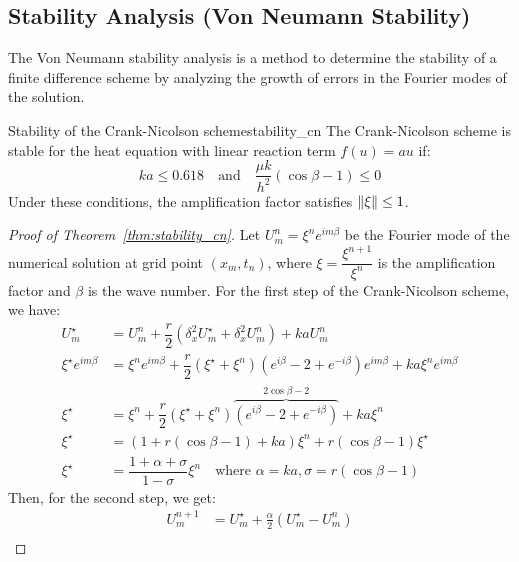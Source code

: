 \subsection{Stability Analysis (Von Neumann Stability)}
The Von Neumann stability analysis is a method to determine the stability of a finite difference scheme by analyzing the growth of errors in the Fourier modes of the solution.
\begin{theorem}{Stability of the Crank-Nicolson scheme}{stability_cn}
  The Crank-Nicolson scheme is stable for the heat equation with linear reaction term \(f(u) = au\) if:
  \[
    ka \leq 0.618 \quad \text{and} \quad \frac{\mu k}{h^2}(\cos\beta - 1) \leq 0
  \]
  Under these conditions, the amplification factor satisfies \(\lVert\xi\rVert \leq 1\).
\end{theorem}
\begin{proof}[Proof of Theorem~\ref{thm:stability_cn}]
  Let \(U_m^n = \xi^n e^{i m \beta}\) be the Fourier mode of the numerical solution at grid point \((x_m, t_n)\), where \(\xi=\dfrac{\xi^{n+1}}{\xi^n}\) is the amplification factor and \(\beta\) is the wave number.
  For the first step of the Crank-Nicolson scheme, we have:
  \begin{align*}
    U_m^\star               & = U_m^n + \dfrac{r}{2} (\delta_x^2 U_m^\star + \delta_x^2 U_m^n) + k a U_m^n                                                                     \\
    \xi^\star e^{i m \beta} & = \xi^n e^{i m \beta} + \dfrac{r}{2} \left(\xi^\star + \xi^n\right)\left(e^{i\beta} - 2 + e^{-i\beta}\right)e^{im\beta}+ k a \xi^n e^{i m \beta} \\
    \xi^\star               & = \xi^n + \dfrac{r}{2} \left(\xi^\star + \xi^n \right)\overbrace{\left(e^{i \beta} - 2 + e^{-i \beta}\right)}^{2\cos\beta - 2} + k a \xi^n       \\
    \xi^\star               & = (1 + r(\cos\beta - 1) + ka) \xi^n + r(\cos\beta - 1)\xi^\star                                                                                  \\
    \xi^\star               & = \dfrac{1 + \alpha + \sigma}{1 - \sigma} \xi^n \quad \text{where } \alpha = ka, \sigma = r(\cos\beta - 1)
  \end{align*}
  Then, for the second step, we get:
  \begin{align*}
    U_m^{n+1}               & = U_m^\star + \tfrac{\alpha}{2}(U_m^\star - U_m^n)                                                                      \\

\end{align*}
\end{proof}
